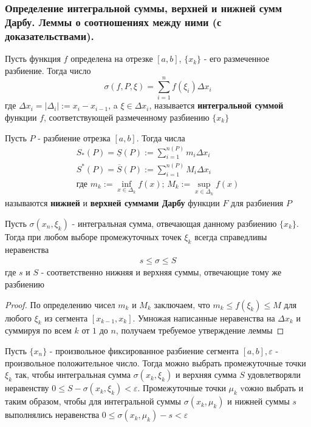 \documentclass[10pt]{article}
\begin{document}
    \subsubsection{Определение интегральной суммы, верхней и нижней сумм Дарбу. Леммы о соотношениях между ними (с доказательствами).}
    \begin{definition}
        Пусть функция $f$ определена на отрезке $[a, b]$, $\{x_k\}$ - его размеченное разбиение. Тогда число
        $$
        \sigma(f, P, \xi) = \sum_{i=1}^n f(\xi_i)\Delta x_i
        $$
        где $\Delta x_i = |\Delta_i| := x_i - x_{i-1}$, a $\xi \in \Delta x_i$, называется \textbf{интегральной суммой} функции $f$, соответствующей размеченному разбиению $\{x_k\}$
    \end{definition}
    \begin{definition}
        Пусть $P$ - разбиение отрезка $[a, b]$. Тогда числа
        \begin{gather*}
            S_{*}(P) = \underline{S}(P) := \sum_{i = 1}^{n(P)} m_i \Delta x_i \\
            S^{*}(P) = \overline{S}(P) := \sum_{i = 1}^{n(P)}M_i \Delta x_i\\
            \text{где }m_k := \inf_{x \in \Delta_k}f(x);\, M_k := \sup_{x \in \Delta_k}f(x)
        \end{gather*}
        называются \textbf{нижней} и \textbf{верхней суммами Дарбу} функции $F$ для разбиения $P$ 
    \end{definition}
    \begin{lemma}
        Пусть $\sigma(x_n, \xi_k)$ - интегральная сумма, отвечающая данному разбиению $\{x_k\}$. Тогда при любом выборе промежуточных точек $\xi_k$ всегда справедливы неравенства
        \begin{gather*}
            s \leq \sigma \leq S
        \end{gather*}
        где $s$ и $S$ - соответственно нижняя и верхняя суммы, отвечающие тому же разбиению
    \end{lemma}
    \begin{proof}
        По определению чисел $m_k$ и $M_k$ заключаем, что $m_k \leq f(\xi_k) \leq M$ для любого $\xi_k$ из сегмента $[x_{k-1}, x_k]$. Умножая написанные неравенства на $\Delta x_k$ и суммируя по всем $k$ от $1$ до $n$, получаем требуемое утверждение леммы
    \end{proof}
    \begin{lemma}
        Пусть $\{x_n\}$ - произвольное фиксированное разбиение сегмента $[a, b], \varepsilon$ - произвольное положительное число. Тогда можно выбрать промежуточные точки $\xi_k$ так, чтобы интегральная сумма $\sigma(x_k, \xi_k)$ и верхняя сумма $S$ удовлетворяли неравенству $0 \leq S-\sigma(x_k, \xi_k) < \varepsilon$. Промежуточные точки $\mu_k$ vожно выбрать и таким образом, чтобы для интегральной суммы $\sigma(x_k, \mu_k)$ и нижней суммы $s$ выполнялись неравенства $0 \leq \sigma(x_k, \mu_k) - s < \varepsilon$
    \end{lemma}
\end{document}
